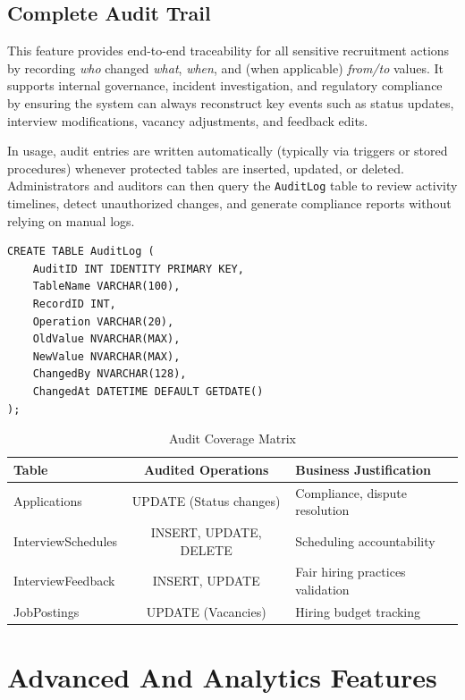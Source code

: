 \documentclass[11pt,a4paper]{article}
\begin{document}
\subsection{Complete Audit Trail}
\noindent
This feature provides end-to-end traceability for all sensitive recruitment actions by recording \emph{who} changed \emph{what}, \emph{when}, and (when applicable) \emph{from/to} values. It supports internal governance, incident investigation, and regulatory compliance by ensuring the system can always reconstruct key events such as status updates, interview modifications, vacancy adjustments, and feedback edits.

In usage, audit entries are written automatically (typically via triggers or stored procedures) whenever protected tables are inserted, updated, or deleted. Administrators and auditors can then query the \texttt{AuditLog} table to review activity timelines, detect unauthorized changes, and generate compliance reports without relying on manual logs.

\begin{verbatim}
CREATE TABLE AuditLog (
    AuditID INT IDENTITY PRIMARY KEY,
    TableName VARCHAR(100),
    RecordID INT,
    Operation VARCHAR(20),
    OldValue NVARCHAR(MAX),
    NewValue NVARCHAR(MAX),
    ChangedBy NVARCHAR(128),
    ChangedAt DATETIME DEFAULT GETDATE()
);
\end{verbatim}

\begin{table}[H]
    \centering
    \begin{tabular}{|l|c|p{8cm}|}
        \hline
        \rowcolor{tableheader}
        \textbf{Table} & \textbf{Audited Operations} & \textbf{Business Justification} \\
        \hline
        Applications & UPDATE (Status changes) & Compliance, dispute resolution \\
        \hline
        InterviewSchedules & INSERT, UPDATE, DELETE & Scheduling accountability \\
        \hline
        InterviewFeedback & INSERT, UPDATE & Fair hiring practices validation \\
        \hline
        JobPostings & UPDATE (Vacancies) & Hiring budget tracking \\
        \hline
    \end{tabular}
    \caption{Audit Coverage Matrix}
\end{table}

\clearpage
\section{Advanced And Analytics Features}
\end{document}
